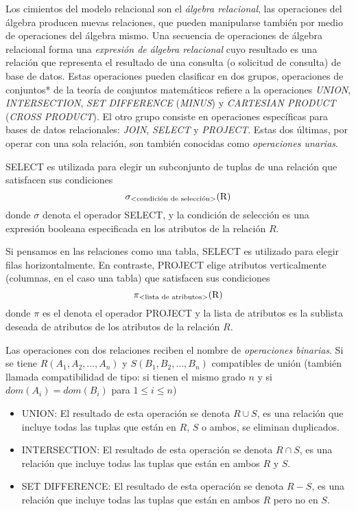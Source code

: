 Los cimientos del modelo relacional son el \emph{álgebra relacional}, las operaciones del álgebra producen nuevas relaciones, que pueden manipularse también por medio de operaciones del álgebra mismo. Una secuencia de operaciones de álgebra relacional forma una \emph{expresión de álgebra relacional} cuyo resultado es una relación que representa el resultado de una consulta (o solicitud de consulta) de base de datos. Estas operaciones pueden clasificar en dos grupos, operaciones de conjuntos* de la teoría de conjuntos matemáticos refiere a la operaciones \emph{UNION}, \emph{INTERSECTION}, \emph{SET DIFFERENCE} (\emph{MINUS}) y \emph{CARTESIAN PRODUCT} (\emph{CROSS PRODUCT}). El otro grupo consiste en operaciones específicas para bases de datos relacionales: \emph{JOIN}, \emph{SELECT} y \emph{PROJECT}. Estas dos últimas, por operar con una sola relación, son también conocidas como \emph{operaciones unarias}.

SELECT es utilizada para elegir un subconjunto de tuplas de una relación que satisfacen sus condiciones
\begin{equation}
\sigma_\text{\textless condición de selección\textgreater}{\text{(R)}}
\end{equation}
donde $\sigma$ denota el operador SELECT, y la condición de selección es una expresión booleana especificada en los atributos de la relación $R$.

Si pensamos en las relaciones como una tabla, SELECT es utilizado para elegir filas horizontalmente. En contraste, PROJECT elige atributos verticalmente (columnas, en el caso una tabla) que satisfacen sus condiciones
\begin{equation}
\pi_\text{\textless lista de atributos\textgreater}{\text{(R)}}
\end{equation}
donde $\pi$ es el denota el operador PROJECT y la lista de atributos es la sublista deseada de atributos de los atributos de la relación $R$.

Las operaciones con dos relaciones reciben el nombre de \emph{operaciones binarias}. Si se tiene $R(A_1,A_2,\ldots,A_n)$ y $S(B_1,B_2,\ldots,B_n)$ compatibles de unión (también llamada compatibilidad de tipo: si tienen el mismo grado $n$ y si $dom(A_i)=dom(B_i)$ para $1\leq i\leq n$)
\begin{itemize}
\item UNION: El resultado de esta operación se denota $R \cup S$, es una relación que incluye todas las tuplas que están en $R$, $S$ o ambos, se eliminan duplicados.
\item INTERSECTION: El resultado de esta operación se denota $R \cap S$, es una relación que incluye todas las tuplas que están en ambos $R$ y $S$.
\item SET DIFFERENCE: El resultado de esta operación se denota $R - S$, es una relación que incluye todas las tuplas que están en ambos $R$ pero no en $S$.
\end{itemize}

